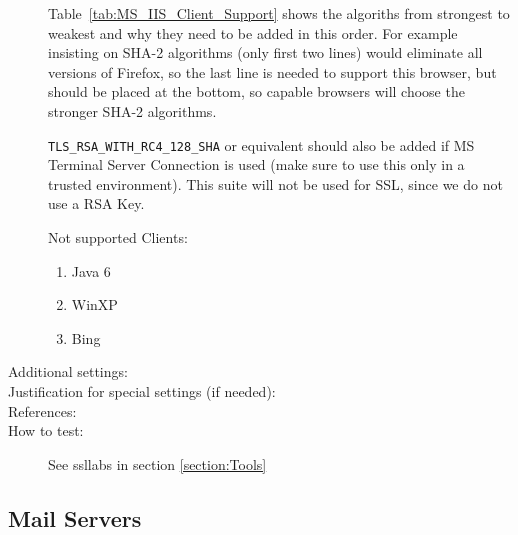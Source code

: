 \begin{description}
Table~\ref{tab:MS_IIS_Client_Support} shows the algoriths from
strongest to weakest and why they need to be added in this order. For
example insisting on SHA-2 algorithms (only first two lines) would
eliminate all versions of Firefox, so the last line is needed to
support this browser, but should be placed at the bottom, so capable
browsers will choose the stronger SHA-2 algorithms.

\verb|TLS_RSA_WITH_RC4_128_SHA| or equivalent should also be added if
MS Terminal Server Connection is used (make sure to use this only in a
trusted environment). This suite will not be used for SSL, since we do
not use a RSA Key.




Not supported Clients:
\begin{enumerate}
\item Java 6
\item WinXP
\item Bing
\end{enumerate}

\item[Additional settings:]


\item[Justification for special settings (if needed):]


\item[References:]



\item[How to test:] See ssllabs in section \ref{section:Tools}


\end{description}



\subsection{Mail Servers}

